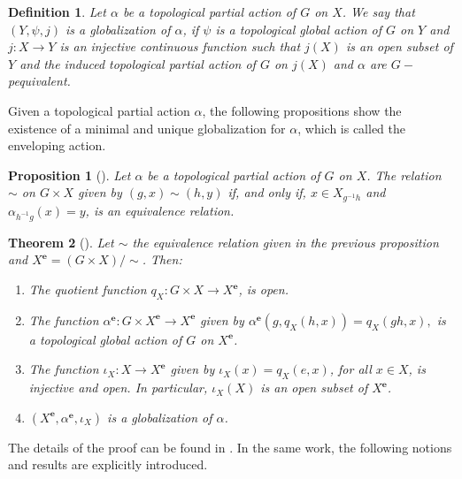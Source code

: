 \documentclass[sn-mathphys-num]{sn-jnl}%
\theoremstyle{thmstyleone}%
\newtheorem{theorem}{Theorem}%
\newtheorem{proposition}[theorem]{Proposition}%
\theoremstyle{thmstyletwo}%
\theoremstyle{thmstylethree}%
\newtheorem{definition}{Definition}%
\begin{document}
\begin{definition}
Let $ \alpha $ be a topological partial action  of $ G $ on $ X $. We  say that $ (Y, \psi,j) $ is a  globalization of $ \alpha $, if $ \psi $ is a topological global  action of $ G $ on $ Y $ and   $ j: X \to Y $ is an injective continuous function such that $ j (X) $ is an open subset of $Y$ and the induced topological partial action of $ G $ on $ j (X) $ and $ \alpha $ are $G-$pequivalent.\\
\end{definition}

Given a topological partial action $\alpha$, the following propositions show the existence of a minimal and unique globalization for $\alpha$, which is called the enveloping action.\\

\begin{proposition}[\cite{Abadie2}]\label{equi}
Let $ \alpha $ be a topological partial action  of $ G $ on $ X $. The relation $ \sim $ on $ G \times X $ given by $ (g, x) \sim (h, y) $ if, and only if, $ x \in X_{g^{- 1}h} $ and $ \alpha_ {h^{- 1}g} (x) = y $, is an equivalence relation.\\
\end{proposition}

\begin{theorem}[\cite{Abadie2}]\label{indc}
Let $ \sim $ the equivalence relation given in the previous proposition and $ X^{\mathbf {e}} = (G \times X) / \sim $.
Then:
\begin{enumerate}
  \item The quotient function $ q_X: G \times X \to X^\mathbf{e} $, is open.
  \item The function $ \alpha^\mathbf{e}: G \times X^\mathbf{e} \to X^\mathbf{e} $ given by $ \alpha^\mathbf{e} (g, q_X (h, x)) = q_X (gh, x),$ is a topological global  action of $ G $ on $ X^\mathbf{e}$.
  \item The function $ \iota_X: X \to X^\mathbf{e} $ given by $ \iota_X(x) = q _X(e, x ) $, for all $x\in X$, is injective
  and open. In particular, $\iota_X(X) $ is an open subset of $ X^\mathbf{e} $.
  \item $ (X^\mathbf{e}, \alpha^\mathbf{e},\iota_X) $ is a globalization of $ \alpha $.
\end{enumerate}
\end{theorem}
The details of the proof can be found in \cite{Avila-Molina}. In the same work, the following notions and results are explicitly introduced.\\
\end{document}
